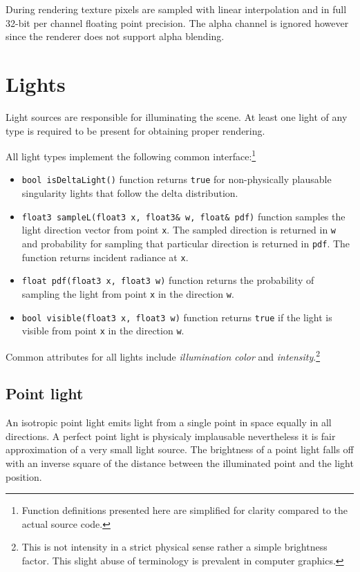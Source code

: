 During rendering texture pixels are sampled with linear interpolation and in full 32-bit per channel floating point precision. The alpha channel is ignored however since the renderer does not support alpha blending.

\section{Lights}
Light sources are responsible for illuminating the scene. At least one light of any type is required to be present for obtaining proper rendering.

All light types implement the following common interface:\footnote{Function definitions presented here are simplified for clarity compared to the actual source code.}
\begin{itemize}
\item \texttt{bool isDeltaLight()} function returns \texttt{true} for non-physically plausable singularity lights that follow the delta distribution.
\item \texttt{float3 sampleL(float3 x, float3\& w, float\& pdf)} function samples the light direction vector from point \texttt{x}. The sampled direction is returned in \texttt{w} and probability for sampling that particular direction is returned in \texttt{pdf}. The function returns incident radiance at \texttt{x}.
\item \texttt{float pdf(float3 x, float3 w)} function returns the probability of sampling the light from point \texttt{x} in the direction \texttt{w}.
\item \texttt{bool visible(float3 x, float3 w)} function returns \texttt{true} if the light is visible from point \texttt{x} in the direction \texttt{w}.
\end{itemize}
Common attributes for all lights include \emph{illumination color} and \emph{intensity}.\footnote{This is not intensity in a strict physical sense rather a simple brightness factor. This slight abuse of terminology is prevalent in computer graphics.}

\subsection{Point light}
An isotropic point light emits light from a single point in space equally in all directions. A perfect point light is physicaly implausable nevertheless it is fair approximation of a very small light source. The brightness of a point light falls off with an inverse square of the distance between the illuminated point and the light position.

